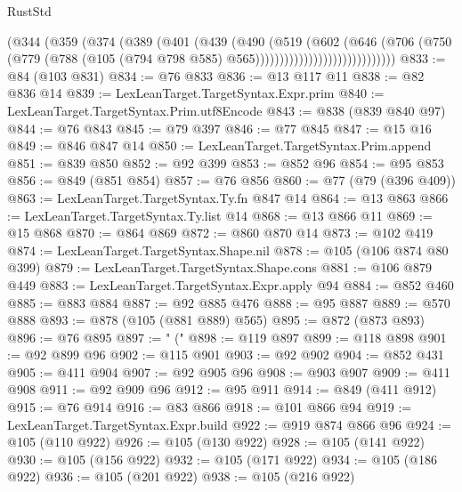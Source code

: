 \begin{lexlean}{RustStd}
\begin{coremodule}
                                (@344
                                  (@359
                                    (@374
                                      (@389
                                        (@401
                                          (@439
                                            (@490
                                              (@519
                                                (@602
                                                  (@646
                                                    (@706
                                                      (@750
                                                        (@779
                                                          (@788
                                                            (@105
                                                              (@794 @798 @585)
                                                              @565)))))))))))))))))))))))))))))
@833 := @84 (@103 @831)
@834 := @76 @833
@836 := @13 @117 @11
@838 := @82 @836 @14
@839 := LexLeanTarget.TargetSyntax.Expr.prim
@840 := LexLeanTarget.TargetSyntax.Prim.utf8Encode
@843 := @838 (@839 @840 @97)
@844 := @76 @843
@845 := @79 @397
@846 := @77 @845
@847 := @15 @16
@849 := @846 @847 @14
@850 := LexLeanTarget.TargetSyntax.Prim.append
@851 := @839 @850
@852 := @92 @399
@853 := @852 @96
@854 := @95 @853
@856 := @849 (@851 @854)
@857 := @76 @856
@860 := @77 (@79 (@396 @409))
@863 := LexLeanTarget.TargetSyntax.Ty.fn @847 @14
@864 := @13 @863
@866 := LexLeanTarget.TargetSyntax.Ty.list @14
@868 := @13 @866 @11
@869 := @15 @868
@870 := @864 @869
@872 := @860 @870 @14
@873 := @102 @419
@874 := LexLeanTarget.TargetSyntax.Shape.nil
@878 := @105 (@106 @874 @80 @399)
@879 := LexLeanTarget.TargetSyntax.Shape.cons
@881 := @106 @879 @449
@883 := LexLeanTarget.TargetSyntax.Expr.apply @94
@884 := @852 @460
@885 := @883 @884
@887 := @92 @885 @476
@888 := @95 @887
@889 := @570 @888
@893 := @878 (@105 (@881 @889) @565)
@895 := @872 (@873 @893)
@896 := @76 @895
@897 := " ("
@898 := @119 @897
@899 := @118 @898
@901 := @92 @899 @96
@902 := @115 @901
@903 := @92 @902
@904 := @852 @431
@905 := @411 @904
@907 := @92 @905 @96
@908 := @903 @907
@909 := @411 @908
@911 := @92 @909 @96
@912 := @95 @911
@914 := @849 (@411 @912)
@915 := @76 @914
@916 := @83 @866
@918 := @101 @866 @94
@919 := LexLeanTarget.TargetSyntax.Expr.build
@922 := @919 @874 @866 @96
@924 := @105 (@110 @922)
@926 := @105 (@130 @922)
@928 := @105 (@141 @922)
@930 := @105 (@156 @922)
@932 := @105 (@171 @922)
@934 := @105 (@186 @922)
@936 := @105 (@201 @922)
@938 := @105 (@216 @922)

\end{coremodule}
\end{lexlean}
